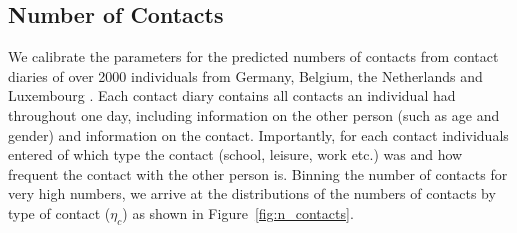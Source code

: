 \subsection{Number of Contacts}
\label{subsec:data_number_of_contacts}

We calibrate the parameters for the predicted numbers of contacts from contact diaries of
over 2000 individuals from Germany, Belgium, the Netherlands and Luxembourg
\citep{Mossong2008}. Each contact diary contains all contacts an individual had
throughout one day, including information on the other person (such as age and gender)
and information on the contact. Importantly, for each contact individuals entered of
which type the contact (school, leisure, work etc.) was and how frequent the contact with
the other person is. Binning the number of contacts for very high numbers, we arrive at
the distributions of the numbers of contacts by type of contact ($\eta_{c}$) as shown in
Figure~\ref{fig:n_contacts}.

